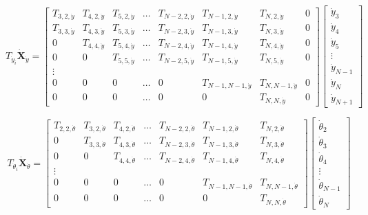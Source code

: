 \documentclass[12pt,letterpaper,titlepage]{article}
\begin{document}
\[
T_{\dot{y}_i}\mathbf{\dot{X}}_{\dot{y}} = \begin{bmatrix}
T_{3,2,\dot{y}}&T_{4,2,\dot{y}}&T_{5,2,\dot{y}}&\hdots&T_{N-2,2,\dot{y}}&T_{N-1,2,\dot{y}}&T_{N,2,\dot{y}}&0\\
T_{3,3,\dot{y}}&T_{4,3,\dot{y}}&T_{5,3,\dot{y}}&\hdots&T_{N-2,3,\dot{y}}&T_{N-1,3,\dot{y}}&T_{N,3,\dot{y}}&0\\
0&T_{4,4,\dot{y}}&T_{5,4,\dot{y}}&\hdots&T_{N-2,4,\dot{y}}&T_{N-1,4,\dot{y}}&T_{N,4,\dot{y}}&0\\
0&0&T_{5,5,\dot{y}}&\hdots&T_{N-2,5,\dot{y}}&T_{N-1,5,\dot{y}}&T_{N,5,\dot{y}}&0\\
\vdots\\
0&0&0&\hdots&0&T_{N-1,N-1,\dot{y}}&T_{N,N-1,\dot{y}}&0\\
0&0&0&\hdots&0&0&T_{N,N,\dot{y}}&0
\end{bmatrix}
\begin{bmatrix}
\dot{y}_3\\
\dot{y}_4\\
\dot{y}_5\\
\vdots\\
\dot{y}_{N-1}\\
\dot{y}_{N}\\
\dot{y}_{N+1}
\end{bmatrix}
\]

\[
T_{\dot{\theta}_i}\mathbf{\dot{X}}_{\dot{\theta}} = \begin{bmatrix}
T_{2,2,\dot{\theta}}&T_{3,2,\dot{\theta}}&T_{4,2,\dot{\theta}}&\hdots&T_{N-2,2,\dot{\theta}}&T_{N-1,2,\dot{\theta}}&T_{N,2,\dot{\theta}}\\
0&T_{3,3,\dot{\theta}}&T_{4,3,\dot{\theta}}&\hdots&T_{N-2,3,\dot{\theta}}&T_{N-1,3,\dot{\theta}}&T_{N,3,\dot{\theta}}\\
0&0&T_{4,4,\dot{\theta}}&\hdots&T_{N-2,4,\dot{\theta}}&T_{N-1,4,\dot{\theta}}&T_{N,4,\dot{\theta}}\\
\vdots\\
0&0&0&\hdots&0&T_{N-1,N-1,\dot{\theta}}&T_{N,N-1,\dot{\theta}}\\
0&0&0&\hdots&0&0&T_{N,N,\dot{\theta}}
\end{bmatrix}
\begin{bmatrix}
\dot{\theta}_2\\
\dot{\theta}_3\\
\dot{\theta}_4\\
\vdots\\
\dot{\theta}_{N-1}\\
\dot{\theta}_{N}
\end{bmatrix}
\]
\end{document}
